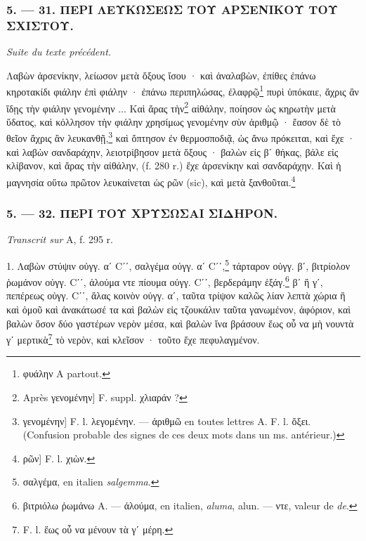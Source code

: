 \documentclass[a4paper, 11pt, oneside, polutonikogreek, french]{article}
\begin{document}
\bigskip
\centerline{\EightStarTaper}
\centerline{\EightStarTaper\EightStarTaper}
\bigskip

\subsubsection{5. --- 31. ΠΕΡΙ ΛΕΥΚΩΣΕΩΣ ΤΟΥ ΑΡΣΕΝΙΚΟΥ ΤΟΥ ΣΧΙΣΤΟΥ.}

\emph{Suite du texte précédent.}

\bigskip

Λαβὼν ἀρσενίκην, λείωσον μετὰ ὄξους ἴσου · καὶ ἀναλαβὼν, ἐπίθες ἐπάνω κηροτακίδι φιάλην ἐπὶ φιάλην · ἐπάνω περιπηλώσας, ἐλαφρῷ\footnote{φυάλην A partout.} πυρὶ ὑπόκαιε, ἄχρις ἂν ἴδῃς τὴν φιάλην γενομένην ... Καὶ ἄρας τὴν\footnote{Après γενομένην] F. suppl. χλιαράν ?} αἰθάλην, ποίησον ὡς κηρωτὴν μετὰ ὕδατος, καὶ κόλλησον τὴν φιάλην χρησίμως γενομένην σὺν ἀριθμῷ · ἔασον δὲ τὸ θεῖον ἄχρις ἂν λευκανθῇ,\footnote{γενομένην] F. l. λεγομένην. --- ἀριθμῶ en toutes lettres A. F. l. ὄξει. (Confusion probable des signes de ces deux mots dans un ms. antérieur.)} καὶ ὄπτησον ἐν θερμοσποδιᾷ, ὡς ἄνω πρόκειται, καὶ ἔχε · καὶ λαβὼν σανδαράχην, λειοτρίβησον μετὰ ὄξους · βαλὼν εἰς βʹ θήκας, βάλε εἰς κλίβανον, καὶ ἄρας τὴν αἰθάλην, (f. 280 r.) ἔχε ἀρσενίκην καὶ σανδαράχην. Καὶ ἡ μαγνησία οὕτω πρῶτον λευκαίνεται ὡς ρῶν (sic), καὶ μετὰ ξανθοῦται.\footnote{ρῶν] F. l. χιὼν.}

\bigskip
\centerline{\EightStarTaper}
\centerline{\EightStarTaper\EightStarTaper}
\bigskip

\subsubsection{5. --- 32. ΠΕΡΙ ΤΟΥ ΧΡΥΣΩΣΑΙ ΣΙΔΗΡΟΝ.}

\emph{Transcrit sur} A, f. 295 r.

\bigskip

1. Λαβὼν στύψιν οὐγγ. αʹ Cʹʹ, σαλγέμα οὐγγ. αʹ Cʹʹ,\footnote{σαλγέμα, en italien \emph{salgemma}.} τάρταρον οὐγγ. βʹ, βιτρίολον ῥωμάνον οὐγγ. Cʹʹ, ἀλούμα ντε πίουμα οὐγγ. Cʹʹ, βερδεράμην ἑξάγ.\footnote{βιτριόλω ῥωμάνω A. --- ἀλούμα, en italien, \emph{aluma}, alun. --- ντε, valeur de \emph{de}.} βʹ ἢ γʹ, πεπέρεως οὐγγ. Cʹʹ, ἅλας κοινὸν οὐγγ. αʹ, ταῦτα τρίψον καλῶς λίαν λεπτὰ χώρια ἢ καὶ ὁμοῦ καὶ ἀνακάτωσέ τα καὶ βαλὼν εἰς τζουκάλιν ταῦτα γανωμένον, ἀφόριον, καὶ βαλὼν ὅσον δύο γαστέρων νερὸν μέσα, καὶ βαλὼν ἵνα βράσουν ἕως οὗ να μὴ νουντὰ γʹ μερτικὰ\footnote{F. l. ἕως οὗ να μένουν τὰ γʹ μέρη.} τὸ νερὸν, καὶ κλεῖσον · τοῦτο ἔχε πεφυλαγμένον.
\end{document}
